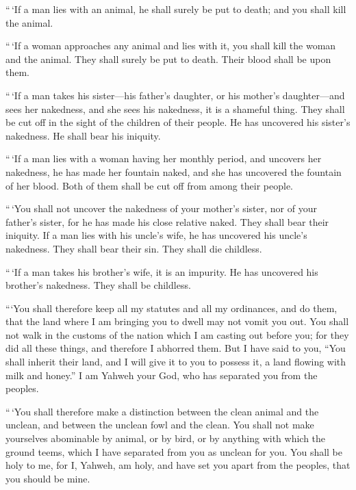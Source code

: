  ``\,`If a man lies with an animal, he shall surely be put
to death; and you shall kill the animal.

 ``\,`If a woman approaches any animal and lies with it,
you shall kill the woman and the animal. They shall surely be put to
death. Their blood shall be upon them.

 ``\,`If a man takes his sister---his father's daughter, or
his mother's daughter---and sees her nakedness, and she sees his
nakedness, it is a shameful thing. They shall be cut off in the sight of
the children of their people. He has uncovered his sister's nakedness.
He shall bear his iniquity.

 ``\,`If a man lies with a woman having her monthly period,
and uncovers her nakedness, he has made her fountain naked, and she has
uncovered the fountain of her blood. Both of them shall be cut off from
among their people.

 ``\,`You shall not uncover the nakedness of your mother's
sister, nor of your father's sister, for he has made his close relative
naked. They shall bear their iniquity.  If a man lies with
his uncle's wife, he has uncovered his uncle's nakedness. They shall
bear their sin. They shall die childless.

 ``\,`If a man takes his brother's wife, it is an impurity.
He has uncovered his brother's nakedness. They shall be childless.

 ```You shall therefore keep all my statutes and all my
ordinances, and do them, that the land where I am bringing you to dwell
may not vomit you out.  You shall not walk in the customs
of the nation which I am casting out before you; for they did all these
things, and therefore I abhorred them.  But I have said to
you, ``You shall inherit their land, and I will give it to you to
possess it, a land flowing with milk and honey.'' I am Yahweh your God,
who has separated you from the peoples.

 ``\,`You shall therefore make a distinction between the
clean animal and the unclean, and between the unclean fowl and the
clean. You shall not make yourselves abominable by animal, or by bird,
or by anything with which the ground teems, which I have separated from
you as unclean for you.  You shall be holy to me, for I,
Yahweh, am holy, and have set you apart from the peoples, that you
should be mine.

